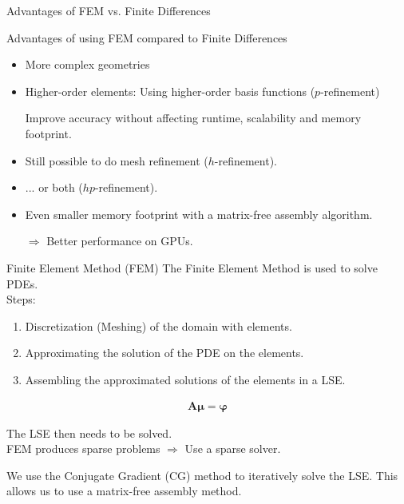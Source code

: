 \documentclass[xcolor=pdftex,table,10pt,yellow,mathserif]{beamer}
\renewcommand{\vec}[1]{\boldsymbol{#1}}
\newcommand{\mat}[1]{\mathbf{#1}}
\begin{document}
\begin{frame}{Advantages of FEM vs. Finite Differences}

    Advantages of using FEM compared to Finite Differences
    \begin{itemize}
        \item More complex geometries
              \pause

        \item Higher-order elements: Using higher-order basis functions ($p$-refinement)

              Improve accuracy without affecting runtime, scalability and memory footprint.
              \pause

        \item Still possible to do mesh refinement ($h$-refinement).
              \pause

        \item ... or both ($hp$-refinement).
              \pause

        \item Even smaller memory footprint with a matrix-free assembly algorithm.

              $\Rightarrow$ Better performance on GPUs.
    \end{itemize}
\end{frame}

\begin{frame}[t]{Finite Element Method (FEM)}
    The Finite Element Method is used to solve PDEs.\\

    Steps:
    \begin{enumerate}
        \item Discretization (Meshing) of the domain with elements.
        \item Approximating the solution of the PDE on the elements.
        \item Assembling the approximated solutions of the elements in a LSE.
    \end{enumerate}

    \pause

    \begin{equation}
        \begin{aligned}
            \mat{A}\vec{\mu} = \vec{\varphi}
        \end{aligned}
    \end{equation}

    The LSE then needs to be solved.\\

    FEM produces sparse problems $\Rightarrow$ Use a sparse solver.\\

    \pause

    We use the Conjugate Gradient (CG) method to iteratively solve the LSE.
    This allows us to use a matrix-free assembly method.
\end{frame}
\end{document}

